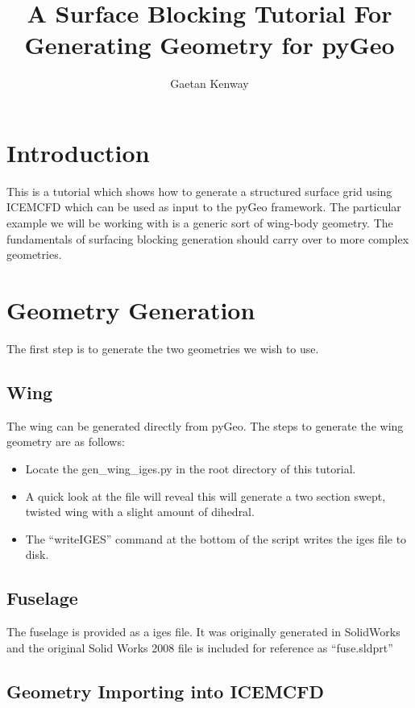 \documentclass{report}
\title{A Surface Blocking Tutorial For Generating Geometry for pyGeo}
\author{Gaetan Kenway}
\begin{document}
%
\maketitle


\section{Introduction}

This is a tutorial which shows how to generate a structured surface grid using ICEMCFD which can be used as input to the pyGeo framework. The particular example we will be working with is a generic sort of wing-body geometry. The fundamentals of surfacing blocking generation should carry over to more complex geometries.

\section{Geometry Generation}

The first step is to generate the two geometries we wish to use. 


\subsection{Wing}

The wing can be generated directly from pyGeo. The steps to generate the wing geometry are as follows:

\begin{itemize}
\item Locate the gen\_wing\_iges.py in the root directory of this tutorial.
\item A quick look at the file will reveal this will generate a two section swept, twisted wing with a slight amount of dihedral. 
\item The ``writeIGES'' command at the bottom of the script writes the iges file to disk.
\end{itemize}

\subsection{Fuselage}

The fuselage is provided as a iges file. It was originally generated in SolidWorks and the original Solid Works 2008 file is included for reference as ``fuse.sldprt''

\subsection{Geometry Importing into ICEMCFD}
\end{document}
